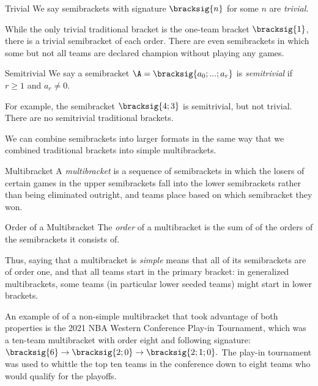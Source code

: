 {    \begin{definition}{Trivial}{}
        We say semibrackets with signature $\bracksig{n}$ for some $n$ are \textit{trivial.}
    \end{definition}

    While the only trivial traditional bracket is the one-team bracket $\bracksig{1}$, there is a trivial semibracket of each order. There are even semibrackets in which some but not all teams are declared champion without playing any games.

    \begin{definition}{Semitrivial}{}
        We say a semibracket $\A = \bracksig{a_0; ...; a_r}$ is \textit{semitrivial} if $r \geq 1$ and $a_r \neq 0.$
    \end{definition}

    For example, the semibracket $\bracksig{4;3}$ is semitrivial, but not trivial. There are no semitrivial traditional brackets.

    We can combine semibrackets into larger formats in the same way that we combined traditional brackets into simple multibrackets.

    \begin{definition}{Multibracket}{} 
        A \textit{multibracket} is a sequence of semibrackets in which the losers of certain games in the upper semibrackets fall into the lower semibrackets rather than being eliminated outright, and teams place based on which semibracket they won.
    \end{definition}

    \begin{definition}{Order of a Multibracket}{}
        The \textit{order} of a multibracket is the sum of of the orders of the semibrackets it consists of.
    \end{definition}

    Thus, saying that a multibracket is \textit{simple} means that all of its semibrackets are of order one, and that all teams start in the primary bracket: in generalized multibrackets, some teams (in particular lower seeded teams) might start in lower brackets.
    
    An example of of a non-simple multibracket that took advantage of both properties is the 2021 NBA Western Conference Play-in Tournament, which was a ten-team multibracket with order eight and following signature:
    $\bracksig{6} \to \bracksig{2;0} \to \bracksig{2;1;0}.$ The play-in tournament was used to whittle the top ten teams in the conference down to eight teams who would qualify for the playoffs.

}
